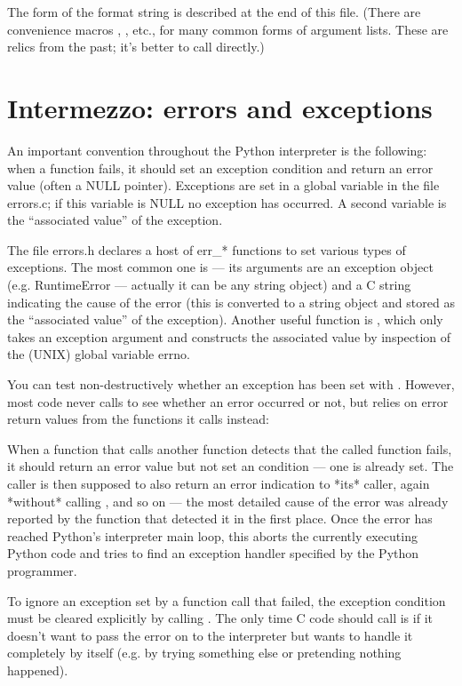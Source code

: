 The form of the format string is described at the end of this file.
(There are convenience macros , ,
etc., for many common forms of argument lists.  These are relics from
the past; it's better to call  directly.)


\section{Intermezzo: errors and exceptions}

An important convention throughout the Python interpreter is the
following: when a function fails, it should set an exception condition
and return an error value (often a NULL pointer).  Exceptions are set
in a global variable in the file errors.c; if this variable is NULL no
exception has occurred.  A second variable is the ``associated value''
of the exception.

The file errors.h declares a host of err_* functions to set various
types of exceptions.  The most common one is  --- its
arguments are an exception object (e.g. RuntimeError --- actually it
can be any string object) and a C string indicating the cause of the
error (this is converted to a string object and stored as the
``associated value'' of the exception).  Another useful function is
, which only takes an exception argument and
constructs the associated value by inspection of the (UNIX) global
variable errno.

You can test non-destructively whether an exception has been set with
.  However, most code never calls
 to see whether an error occurred or not, but
relies on error return values from the functions it calls instead:

When a function that calls another function detects that the called
function fails, it should return an error value but not set an
condition --- one is already set.  The caller is then supposed to also
return an error indication to *its* caller, again *without* calling
, and so on --- the most detailed cause of the error
was already reported by the function that detected it in the first
place.  Once the error has reached Python's interpreter main loop,
this aborts the currently executing Python code and tries to find an
exception handler specified by the Python programmer.

To ignore an exception set by a function call that failed, the
exception condition must be cleared explicitly by calling
.  The only time C code should call
 is if it doesn't want to pass the error on to the
interpreter but wants to handle it completely by itself (e.g. by
trying something else or pretending nothing happened).


